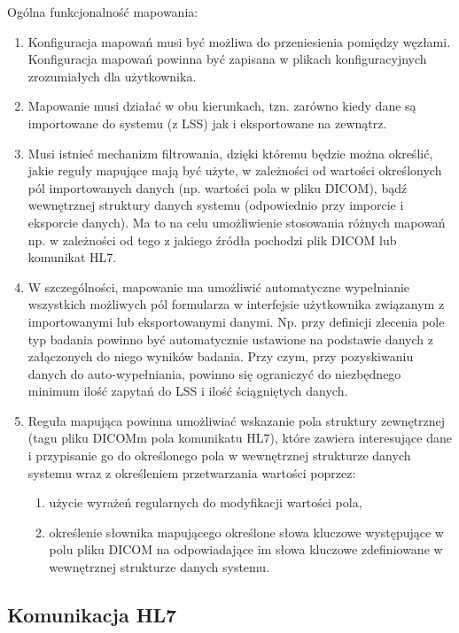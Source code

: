 \documentclass[a4paper]{report}
\begin{document}
Ogólna funkcjonalność mapowania:
\begin{enumerate}
  \item Konfiguracja mapowań musi być możliwa do przeniesienia pomiędzy węzłami. Konfiguracja mapowań powinna być zapisana w plikach konfiguracyjnych zrozumiałych dla użytkownika.
  \item Mapowanie musi działać w obu kierunkach, tzn. zarówno kiedy dane są importowane do systemu (z LSS) jak i eksportowane na zewnątrz.
  \item Musi istnieć mechanizm filtrowania, dzięki któremu będzie można określić, jakie reguły mapujące mają być użyte, w zależności od wartości określonych pól importowanych danych (np. wartości pola w pliku DICOM), bądź wewnętrznej struktury danych systemu (odpowiednio przy imporcie i eksporcie danych). Ma to na celu umożliwienie stosowania różnych mapowań np. w zależności od tego z jakiego źródła pochodzi plik DICOM lub komunikat HL7.
  \item W szczególności, mapowanie ma umożliwić automatyczne wypełnianie wszystkich możliwych pól formularza w interfejsie użytkownika związanym z importowanymi lub eksportowanymi danymi. Np. przy definicji zlecenia  pole typ badania powinno być automatycznie ustawione na podstawie danych z załączonych do niego wyników badania. Przy czym, przy pozyskiwaniu danych do auto-wypełniania, powinno się ograniczyć do niezbędnego minimum ilość zapytań do LSS i ilość ściągniętych danych.
  \item Reguła mapująca powinna umożliwiać wskazanie pola struktury zewnętrznej (tagu pliku DICOMm pola komunikatu HL7), które zawiera interesujące dane i przypisanie go do określonego pola w wewnętrznej strukturze danych systemu wraz z określeniem przetwarzania wartości poprzez:
    \begin{enumerate}
      \item użycie wyrażeń regularnych do modyfikacji wartości pola,
      \item określenie słownika mapującego określone słowa kluczowe występujące w polu pliku DICOM na odpowiadające im słowa kluczowe zdefiniowane w wewnętrznej strukturze danych systemu.
    \end{enumerate}

\end{enumerate}

\subsection{Komunikacja HL7}
\end{document}
